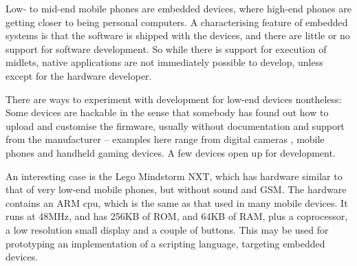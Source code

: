 \documentclass[11pt]{report}
\begin{document}
Low- to mid-end mobile phones are embedded devices, where high-end phones are getting closer to being personal computers.
A characterising feature of embedded systems is that the software is shipped with the devices, and there are little or no support for software development.
So while there is support for execution of midlets, native applications are not immediately possible to develop, unless except for the hardware developer.

There are ways to experiment with development for low-end devices nontheless:
Some devices are hackable in the sense that somebody has found out how to upload and customise the firmware, usually without documentation and support from the manufacturer -- examples here range from digital cameras \cite{canonhack}, mobile phones \cite{motorolahack} and handheld gaming devices\cite{nintendodshack}.
A few devices open up for development.

An interesting case is the Lego Mindstorm NXT, which has hardware similar to that of very low-end mobile phones, but without sound and GSM. 
The hardware contains an ARM cpu\cite{arm7tdmi}, which is the same as that used in many mobile devices. It runs at 48MHz, and has 256KB of ROM, and 64KB of RAM, plus a coprocessor, a low resolution small display and a couple of buttons. 
This may be used for prototyping an implementation of a scripting language, targeting embedded devices. 



\end{document}
